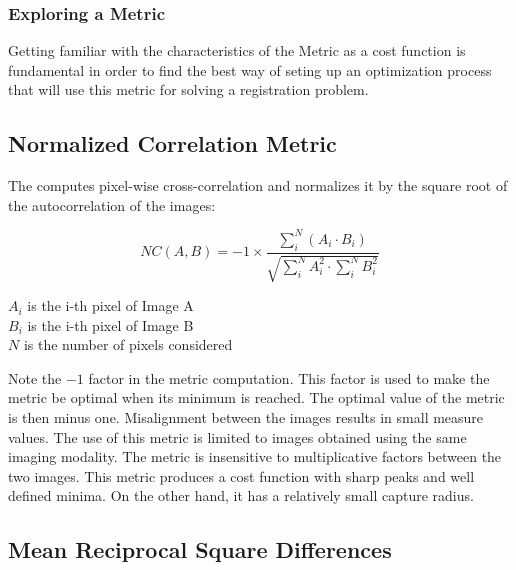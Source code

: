 \subsubsection{Exploring a Metric}
\label{sec:ExploringAMetric}

Getting familiar with the characteristics of the Metric as a cost function is
fundamental in order to find the best way of seting up an optimization process
that will use this metric for solving a registration problem. 

\ifitkFullVersion

\fi


\subsection{Normalized Correlation Metric}
\label{sec:NormalizedCorrelationMetric}

The  computes pixel-wise
cross-correlation and normalizes it by the square root of the autocorrelation
of the images:

\begin{equation}
NC(A,B) = -1 \times \frac{ \sum_i^N \left( A_i \cdot B_i \right) }
         { \sqrt { \sum_i^N A_i^2  \cdot \sum_i^N B_i^2 } }
\end{equation}
\begin{center}
$A_i$ is the i-th pixel of Image A\\ 
$B_i$ is the i-th pixel of Image B\\
$N$ is the number of pixels considered
\end{center}

Note the $-1$ factor in the metric computation. This factor is used to make the
metric be optimal when its minimum is reached.  The optimal value of the metric
is then minus one. Misalignment between the images results in small measure
values.  The use of this metric is limited to images obtained using the same
imaging modality.  The metric is insensitive to multiplicative factors between
the two images.  This metric produces a cost function with sharp peaks and well
defined minima.  On the other hand, it has a relatively small capture radius.

\subsection{Mean Reciprocal Square Differences}
\label{sec:MeanReciprocalSquareDifferenceMetric}

